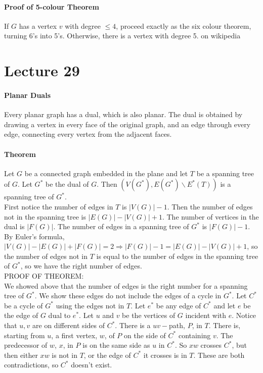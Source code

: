 \documentclass[10pt,letter]{article}
\begin{document}
\paragraph{Proof of 5-colour Theorem}
If $G$ has a vertex $v$ with degree $\leq4$, proceed exactly as the six colour theorem, turning 6's into 5's. Otherwise, there is a vertex with degree 5. on wikipedia

\section*{Lecture 29}
\paragraph{Planar Duals}
Every planar graph has a dual, which is also planar. The dual is obtained by drawing a vertex in every face of the original graph, and an edge through every edge, connecting every vertex from the adjacent faces. 
\paragraph{Theorem}
Let $G$ be a connected graph embedded in the plane and let $T$ be a spanning tree of $G$. Let $G^*$ be the dual of $G$. Then $(V(G^*),E(G^*)\backslash E^*(T))$ is a spanning tree of $G^*$. \\ 
First notice the number of edges in $T$ is $|V(G)|-1$. Then the number of edges not in the spanning tree is $|E(G)|-|V(G)|+1$. The number of vertices in the dual is $|F(G)|$. The number of edges in a spanning tree of $G^*$ is $|F(G)|-1$. By Euler's formula, $|V(G)|-|E(G)|+|F(G)|=2\Rightarrow |F(G)|-1=|E(G)|-|V(G)|+1$, so the number of edges not in $T$ is equal to the number of edges in the spanning tree of $G^*$, so we have the right number of edges. \\ 
PROOF OF THEOREM: \\ 
We showed above that the number of edges is the right number for a spanning tree of $G^*$. We show these edges do not include the edges of a cycle in $G^*$. Let $C^*$ be a cycle of $G^*$ using the edges not in $T$. Let $e^*$ be any edge of $C^*$ and let $e$ be the edge of $G$ dual to $e^*$. Let $u$ and $v$ be the vertices of $G$ incident with $e$. Notice that $u,v$ are on different sides of $C^*$. There is a $uv-$path, $P$, in $T$. There is, starting from $u$, a first vertex, $w$, of $P$ on the side of $C^*$ containing $v$. The predecessor of $w$, $x$, in $P$ is on the same side as $u$ in $C^*$. So $xw$ crosses $C^*$, but then either $xw$ is not in $T$, or the edge of $C^*$ it crosses is in $T$. These are both contradictions, so $C^*$ doesn't exist. 
    
\end{document}
